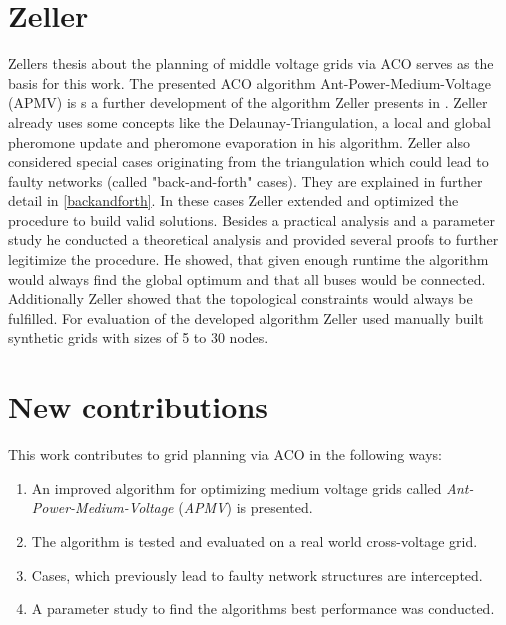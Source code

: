 \section{Zeller}
Zellers thesis about the planning of middle voltage grids via ACO serves as the basis for this work. The presented ACO algorithm Ant-Power-Medium-Voltage (APMV) is s a further development of the algorithm Zeller presents in \cite{zeller2021planung}. Zeller already uses some concepts like the Delaunay-Triangulation, a local and global pheromone update and pheromone evaporation in his algorithm. Zeller also considered special cases originating from the triangulation which could lead to faulty networks (called "back-and-forth" cases). They are explained in further detail in \ref{backandforth}. In these cases Zeller extended and optimized the procedure to build valid solutions. Besides a practical analysis and a parameter study he conducted a theoretical analysis and provided several proofs to further legitimize the procedure. He showed, that given enough runtime the algorithm would always find the global optimum and that all buses would be connected. Additionally Zeller showed that the topological constraints would always be fulfilled. For evaluation of the developed algorithm Zeller used manually built synthetic grids with sizes of 5 to 30 nodes.

\newpage
\section{New contributions}
This work contributes to grid planning via ACO in the following ways:
\begin{enumerate}
	\setlength\itemsep{-0.5em}
	\item An improved algorithm for optimizing medium voltage grids called \textit{Ant-Power-Medium-Voltage} (\textit{APMV}) is presented.
	\item The algorithm is tested and evaluated on a real world cross-voltage grid.
	\item Cases, which previously lead to faulty network structures are intercepted.
	\item A parameter study to find the algorithms best performance was conducted.
\end{enumerate}

